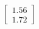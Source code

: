 \documentclass[preview]{standalone}
\begin{document}
\begin{align*}
\begin{bmatrix} 1.56 \\ 1.72 \end{bmatrix}
\end{align*}
\end{document}
